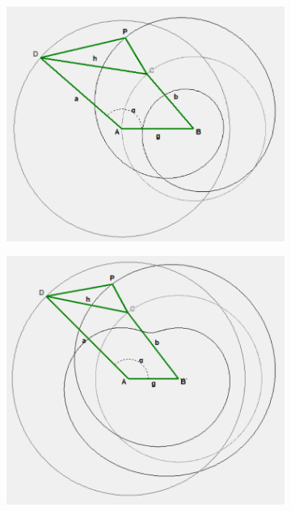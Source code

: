 \documentclass{article}
\begin{document}
\begin{figure}[h]
\begin{subfigure}{0.19\textwidth}
		\caption{}
	\end{subfigure}
	\hfill
	\begin{subfigure}{0.19\textwidth}
		\centering
		\includegraphics[width=\linewidth, height=0.95\linewidth, keepaspectratio]{./Figures/27_motion_cases/0-10.png}
		\caption{}
	\end{subfigure}
	\hfill
	\begin{subfigure}{0.19\textwidth}
		\centering
		\includegraphics[width=\linewidth, height=0.95\linewidth, keepaspectratio]{./Figures/27_motion_cases/-1-10.png}

\end{subfigure}
\end{figure}
\end{document}
